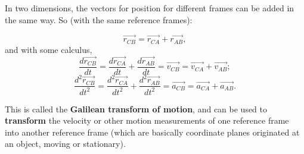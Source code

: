 \documentclass[12pt,letterpaper]{article}
\begin{document}
In two dimensions, the vectors for position for different frames can be added in the same way. So (with the same reference frames):

\begin{center}
	$$\vec{r_{CB}} = \vec{r_{CA}} + \vec{r_{AB}},$$
	and with some calculus,
	$$\frac{d\vec{r_{CB}}}{dt} = \frac{d\vec{r_{CA}}}{dt} + \frac{d\vec{r_{AB}}}{dt} = \vec{v_{CB}} = \vec{v_{CA}} + \vec{v_{AB}};$$
	$$\frac{d^{2}\vec{r_{CB}}}{dt^{2}} = \frac{d^{2}\vec{r_{CA}}}{dt^{2}} + \frac{d^{2}\vec{r_{AB}}}{dt^{2}} = \vec{a_{CB}} = \vec{a_{CA}} + \vec{a_{AB}}.$$\linebreak
\end{center}

This is called the \textbf{Galilean transform of motion}, and can be used to \textbf{transform} the velocity or other motion measurements of one reference frame into another reference frame (which are basically coordinate planes originated at an object, moving or stationary).
\end{document}
